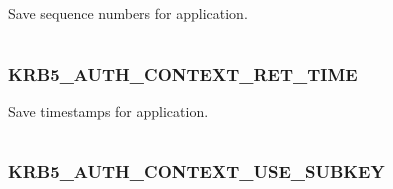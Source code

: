 \documentclass[letterpaper,10pt,english]{sphinxmanual}
\begin{document}
Save sequence numbers for application.

\begin{tabulary}{\linewidth}{|L|L|}
\hline

 & 
\\
\hline\end{tabulary}



\subsubsection{KRB5\_AUTH\_CONTEXT\_RET\_TIME}
\label{appdev/refs/macros/KRB5_AUTH_CONTEXT_RET_TIME::doc}\label{appdev/refs/macros/KRB5_AUTH_CONTEXT_RET_TIME:krb5-auth-context-ret-time}\label{appdev/refs/macros/KRB5_AUTH_CONTEXT_RET_TIME:krb5-auth-context-ret-time-data}

\begin{fulllineitems}
\label{appdev/refs/macros/KRB5_AUTH_CONTEXT_RET_TIME:KRB5_AUTH_CONTEXT_RET_TIME}
\end{fulllineitems}


Save timestamps for application.

\begin{tabulary}{\linewidth}{|L|L|}
\hline

 & 
\\
\hline\end{tabulary}



\subsubsection{KRB5\_AUTH\_CONTEXT\_USE\_SUBKEY}
\label{appdev/refs/macros/KRB5_AUTH_CONTEXT_USE_SUBKEY::doc}\label{appdev/refs/macros/KRB5_AUTH_CONTEXT_USE_SUBKEY:krb5-auth-context-use-subkey-data}\label{appdev/refs/macros/KRB5_AUTH_CONTEXT_USE_SUBKEY:krb5-auth-context-use-subkey}

\begin{fulllineitems}
\label{appdev/refs/macros/KRB5_AUTH_CONTEXT_USE_SUBKEY:KRB5_AUTH_CONTEXT_USE_SUBKEY}
\end{fulllineitems}
\end{document}
